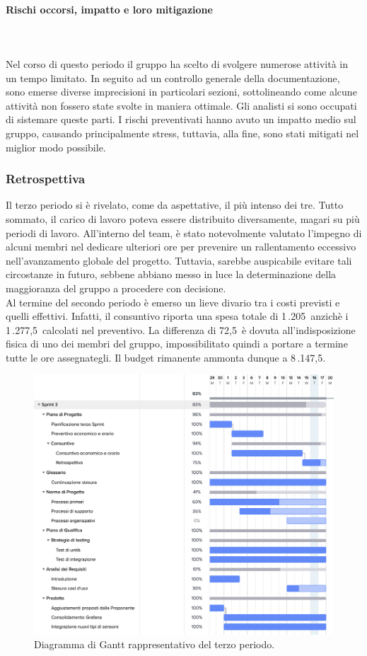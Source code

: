 \documentclass[8pt]{article}
\newcommand{\subsubsubsection}[1]{\paragraph{#1}\mbox{}\\}
\begin{document}
\subsubsubsection{Rischi occorsi, impatto e loro mitigazione}
\\Nel corso di questo periodo il gruppo ha scelto di svolgere numerose attivit\`{a} in un tempo limitato.
In seguito ad un controllo generale della documentazione, sono emerse diverse imprecisioni in
particolari sezioni, sottolineando come alcune attivit\`{a} non fossero state svolte in maniera
ottimale. Gli analisti si sono occupati di sistemare queste parti. I rischi preventivati hanno avuto un impatto medio sul gruppo, causando principalmente stress, tuttavia, alla fine, sono stati mitigati nel miglior modo possibile.
\subsubsection{Retrospettiva}
Il terzo periodo si è rivelato, come da aspettative, il pi\`{u} intenso dei tre. Tutto sommato, il
carico di lavoro poteva essere distribuito diversamente, magari su pi\`{u} periodi di lavoro.
All'interno del team, è stato notevolmente valutato l'impegno di alcuni membri nel dedicare
ulteriori ore per prevenire un rallentamento eccessivo nell'avanzamento globale del progetto.
Tuttavia, sarebbe auspicabile evitare tali circostanze in futuro, sebbene abbiano messo in luce la
determinazione della maggioranza del gruppo a procedere con decisione.\\
Al termine del secondo periodo è emerso un lieve divario tra i costi previsti e quelli effettivi.
Infatti, il consuntivo riporta una spesa totale di 1\,.205\;\texteuro\ anzichè i 1\,.277,5\;\texteuro\ calcolati
nel preventivo. La differenza di 72,5\;\texteuro\ è dovuta all'indisposizione fisica di uno dei membri del gruppo, impossibilitato quindi a portare a termine tutte le ore assegnategli. Il budget rimanente ammonta dunque a 8\,.147,5\;\texteuro.
\begin{figure}[h!]
    \centering
    \includegraphics[width=13cm]{./images_pdp/gantt3.png}
    \caption{Diagramma di Gantt rappresentativo del terzo periodo.}
\end{figure}
\clearpage
\end{document}
